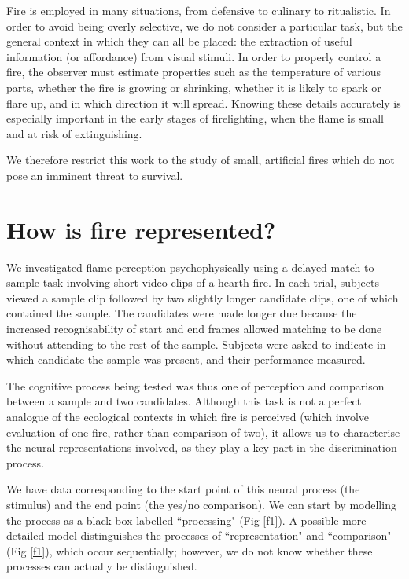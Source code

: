 \documentclass[a4paper]{article}
\begin{document}
Fire is employed in many situations, from defensive to culinary to ritualistic. In order to avoid being overly selective, we do not consider a particular task, but the general context in which they can all be placed: the extraction of useful information (or affordance) from visual stimuli. In order to properly control a fire, the observer must estimate properties such as the temperature of various parts, whether the fire is growing or shrinking, whether it is likely to spark or flare up, and in which direction it will spread. Knowing these details accurately is especially important in the early stages of firelighting, when the flame is small and at risk of extinguishing.

We therefore restrict this work to the study of small, artificial fires which do not pose an imminent threat to survival. 

\section{How is fire represented?}


We investigated flame perception psychophysically using a delayed match-to-sample task involving short video clips of a hearth fire. In each trial, subjects viewed a sample clip followed by two slightly longer candidate clips, one of which contained the sample. The candidates were made longer due because the increased recognisability of start and end frames allowed matching to be done without attending to the rest of the sample. Subjects were asked to indicate in which candidate the sample was present, and their performance measured.

The cognitive process being tested was thus one of perception and comparison between a sample and two candidates. Although this task is not a perfect analogue of the ecological contexts in which fire is perceived (which involve evaluation of one fire, rather than comparison of two), it allows us to characterise the neural representations involved, as they play a key part in the discrimination process.

We have data corresponding to the start point of this neural process (the stimulus) and the end point (the yes/no comparison). We can start by modelling the process as a black box labelled ``processing" (Fig \ref{f1}). A possible more detailed model distinguishes the processes of ``representation" and ``comparison" (Fig \ref{f1}), which occur sequentially; however, we do not know whether these processes can actually be distinguished.
\end{document}
